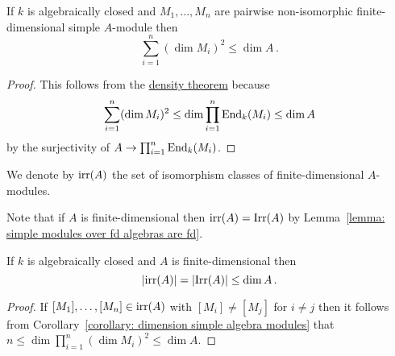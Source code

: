 

\begin{corollary}
  \label{corollary: dimension simple algebra modules}
  If $k$ is algebraically closed and $M_1, \dotsc, M_n$ are pairwise non-iso\-morphic finite-dimensional simple $A$-module then
  \[
          \sum_{i=1}^n (\dim M_i)^2
    \leq  \dim A \,.
  \]
\end{corollary}


\begin{proof}
  This follows from the \hyperref[theorem: density theorem]{density theorem} because
  \[
          \sum_{i=1}^n (\dim M_i)^2
    \leq  \dim \prod_{i=1}^n \operatorname{End}_k(M_i)
    \leq  \dim A
  \]
  by the surjectivity of $A \to \prod_{i=1}^n \operatorname{End}_k(M_i)$.
\end{proof}




\begin{notation}
  We denote by $\operatorname{irr}(A)$ the set of isomorphism classes of finite-dimen\-sional $A$-modules.
\end{notation}


\begin{fluff}
  Note that if $A$ is finite-dimensional then $\operatorname{irr}(A) = \operatorname{Irr}(A)$ by Lemma~\ref{lemma: simple modules over fd algebras are fd}.
\end{fluff}


\begin{corollary}
  If $k$ is algebraically closed and $A$ is finite-dimensional then
  \[
          |{\operatorname{irr}(A)}|
    =     |{\operatorname{Irr}(A)}|
    \leq  \dim A \,.
  \]
\end{corollary}


\begin{proof}
  If $[M_1], \dotsc, [M_n] \in \operatorname{irr}(A)$ with $[M_i] \neq [M_j]$ for $i \neq j$ then it follows from Corollary~\ref{corollary: dimension simple algebra modules} that $n \leq  \dim \prod_{i=1}^n (\dim M_i)^2 \leq \dim A$.
\end{proof}




